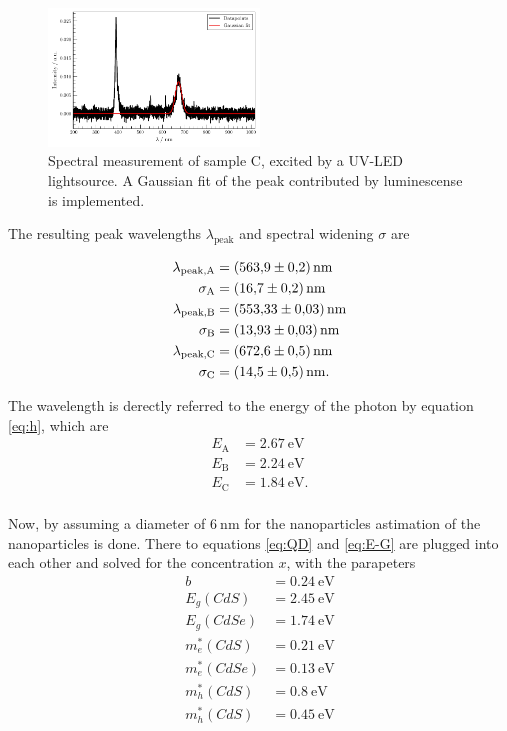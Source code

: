 \begin{figure}
    \captionsetup{width=0.9\linewidth}
    \includegraphics[width=0.5\textwidth]{plots/Samp_C_D.pdf}
  \caption{Spectral measurement of sample C, excited by a UV-LED lightsource. A Gaussian fit of the peak contributed by luminescense is implemented.}
    \label{fig:Samp_B_D}
\end{figure}

The resulting peak wavelengths $\lambda_\text{peak}$ and spectral widening $\sigma$ are

\begin{align*}
    \lambda_\text{peak,A} &= \SI{563.9 \pm 0.2}{\nano\meter} \\
    \sigma_\text{A} &= \SI{16.7 \pm 0.2}{\nano\meter} \\
    \lambda_\text{peak,B} &= \SI{553.33 \pm 0.03}{\nano\meter} \\
    \sigma_\text{B} &= \SI{13.93 \pm 0.03}{\nano\meter} \\
    \lambda_\text{peak,C} &= \SI{672.6 \pm 0.5}{\nano\meter} \\
    \sigma_\text{C} &= \SI{14.5 \pm 0.5}{\nano\meter}. \\
\end{align*}

The wavelength is derectly referred to the energy of the photon by equation \ref{eq:h}, which are 
\begin{align*}
    E_\text{A} &= \SI{2.67}{\eV} \\
    E_\text{B} &= \SI{2.24}{\eV} \\
    E_\text{C} &= \SI{1.84}{\eV}. \\
\end{align*}

Now, by assuming a diameter of $\SI{6}{\nano\meter}$ for the nanoparticles astimation of the nanoparticles is done.
There to equations \ref{eq:QD} and \ref{eq:E-G} are plugged into each other and solved for the concentration $x$, with the parapeters
\begin{align*}
    b          &= \SI{0.24}{\eV}\\
    E_g(CdS)   &= \SI{2.45}{\eV}\\
    E_g(CdSe)  &= \SI{1.74}{\eV}\\
    m^*_e(CdS) &= \SI{0.21}{\eV}\\
    m^*_e(CdSe)&= \SI{0.13}{\eV}\\
    m^*_h(CdS) &= \SI{0.8}{\eV}\\
    m^*_h(CdS) &= \SI{0.45}{\eV}\\
\end{align*}